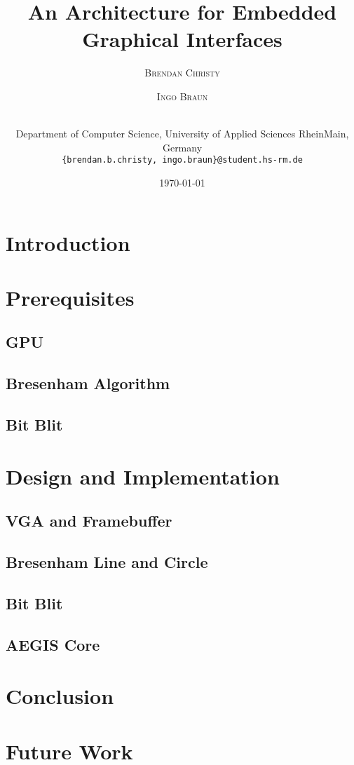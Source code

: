 \documentclass[a4paper]{article}
\title{An Architecture for Embedded Graphical Interfaces} %
\author{%
	\textsc{Brendan Christy} \and \textsc{Ingo Braun} \and\\[-2ex]
	\vspace{1pt} \footnotesize Department of Computer Science, University of Applied Sciences RheinMain, Germany \\ 
	\vspace{1pt} \footnotesize \texttt{\{brendan.b.christy, ingo.braun\}@student.hs-rm.de}
}
\date{\today} %
\begin{document}
	
	
	
	\maketitle
	
	\section{Introduction}
	
	
	\section{Prerequisites}
	
	\subsection{GPU}
	
	
	\subsection{Bresenham Algorithm}
	
	
	\subsection{Bit Blit}
	
	
	\section{Design and Implementation}
	\subsection{VGA and Framebuffer}
	
	
	\subsection{Bresenham Line and Circle}
	
	
	\subsection{Bit Blit}
	
	
	\subsection{AEGIS Core}
	
	
	
	\section{Conclusion}
	
	
	\section{Future Work}
	
	
	\printbibliography
	
	
\end{document}

